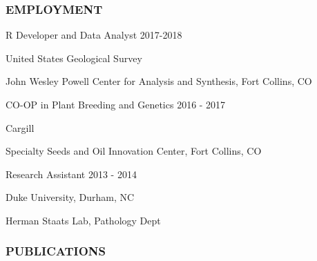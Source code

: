 \documentclass[12pt,english]{article}
\begin{document}

\subsubsection*{EMPLOYMENT}
\vspace{-0.5ex}\par

\hspace{1.0em} R Developer and Data Analyst
\hfill
2017-2018
\vspace{-0.5ex}\par
\hspace{2.0em} United States Geological Survey
\vspace{-0.5ex}\par
\hspace{2.0em} John Wesley Powell Center for Analysis and Synthesis, Fort Collins, CO
\hfill
\vspace{0.5em}\par

\hspace{1.0em} CO-OP in Plant Breeding and Genetics
\hfill
2016 - 2017
\vspace{-0.5ex}\par
\hspace{2.0em} Cargill
\vspace{-0.5ex}\par
\hspace{2.0em} Specialty Seeds and Oil Innovation Center, Fort Collins, CO
\vspace{0.5em}\par

\hspace{1.0em} Research Assistant
\hfill
2013 - 2014
\vspace{-0.5ex}\par
\hspace{2.0em} Duke University, Durham, NC
\vspace{-0.5ex}\par
\hspace{2.0em} Herman Staats Lab, Pathology Dept

\vspace{0.5em}\par

\subsubsection*{PUBLICATIONS}
\vspace{-0.5ex}
\end{document}
